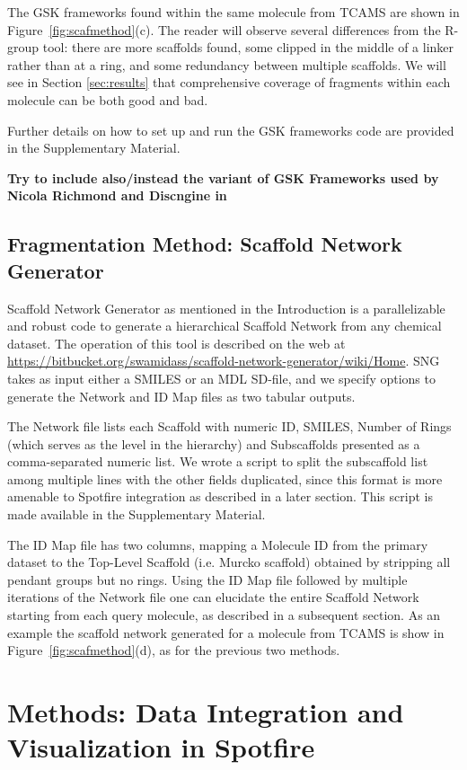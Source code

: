 \documentclass[journal=jacsat,manuscript=article]{achemso}
\newcommand*\fref[1]{Figure~\ref{fig:#1}}
\begin{document}
The GSK frameworks found within the same molecule from TCAMS are shown in \fref{scafmethod}(c).  The reader will observe several differences from the R-group tool: there are more scaffolds found, some clipped in the middle of a linker rather than at a ring, and some redundancy between multiple scaffolds. We will see in Section \ref{sec:results} that comprehensive coverage of fragments within each molecule can be both good and bad.   

Further details on how to set up and run the GSK frameworks code are provided in the Supplementary Material. 

\textbf{Try to include also/instead the variant of GSK Frameworks used by Nicola Richmond and Discngine in \cite{Richmond2015Galois}}

\subsection{Fragmentation Method: Scaffold Network Generator}
\label{sec:SNG}
Scaffold Network Generator \cite{Matlock2013SNG} as mentioned in the Introduction is a parallelizable and robust code to generate a hierarchical Scaffold Network from any chemical dataset. The operation of this tool is described on the web at \url{https://bitbucket.org/swamidass/scaffold-network-generator/wiki/Home}. SNG takes as input either a SMILES or an MDL SD-file, and we specify options to generate the Network and ID Map files as two tabular outputs.

The Network file lists each Scaffold with numeric ID, SMILES, Number of Rings (which serves as the level in the hierarchy) and Subscaffolds presented as a comma-separated numeric list. We wrote a script to split the subscaffold list among multiple lines with the other fields duplicated, since this format is more amenable to Spotfire integration as described in a later section.  This script is made available in the Supplementary Material.    

The ID Map file has two columns, mapping a Molecule ID from the primary dataset to the Top-Level Scaffold (i.e. Murcko scaffold) obtained by stripping all pendant groups but no rings. Using the ID Map file followed by multiple iterations of the Network file one can elucidate the entire Scaffold Network starting from each query molecule, as described in a subsequent section.  As an example the scaffold network generated for a molecule from TCAMS is show in \fref{scafmethod}(d), as for the previous two methods.


\section{Methods: Data Integration and Visualization in Spotfire}
\label{sec:methods2}
\end{document}
